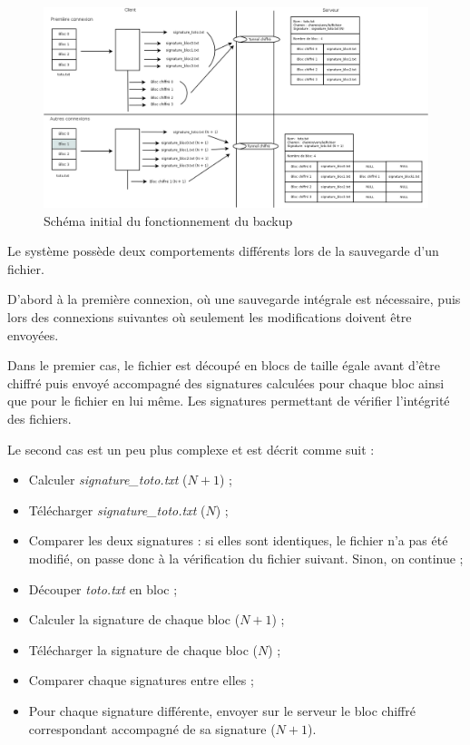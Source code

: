 \documentclass[a4paper,10pt, twoside]{report}
\begin{document}
\begin{spacing}{1.2}
\begin{figure}[h!]
    \hspace{-4.5em}
    \includegraphics[width=19cm]{algo/schemaInitial.png}
    \caption{\label{schemaInitial} Schéma initial du fonctionnement du backup}
\end{figure}

Le système possède deux comportements différents lors de la sauvegarde d'un
fichier.

\bigskip

D'abord à la première connexion, où une sauvegarde intégrale est nécessaire,
puis lors des connexions suivantes où seulement les modifications doivent
être envoyées.

Dans le premier cas, le fichier est découpé en blocs de taille égale avant
d'être chiffré puis envoyé accompagné des signatures calculées pour chaque
bloc ainsi que pour le fichier en lui même. Les signatures permettant de
vérifier l'intégrité des fichiers. 

Le second cas est un peu plus complexe et est décrit comme suit :

\begin{itemize}
 \item Calculer \textit{signature\_toto.txt} (\(N + 1\)) ;
 \item Télécharger \textit{signature\_toto.txt} (\(N\)) ;
 \item Comparer les deux signatures : si elles sont identiques, le fichier n'a
 pas été modifié, on passe donc à la vérification du fichier suivant. Sinon,
 on continue ;
 \item Découper \textit{toto.txt} en bloc ;
 \item Calculer la signature de chaque bloc (\(N + 1\)) ;
 \item Télécharger la signature de chaque bloc (\(N\)) ;
 \item Comparer chaque signatures entre elles ;
 \item Pour chaque signature différente, envoyer sur le serveur le bloc
 chiffré correspondant accompagné de sa signature (\(N + 1\)).
\end{itemize}


\end{spacing}
\end{document}
